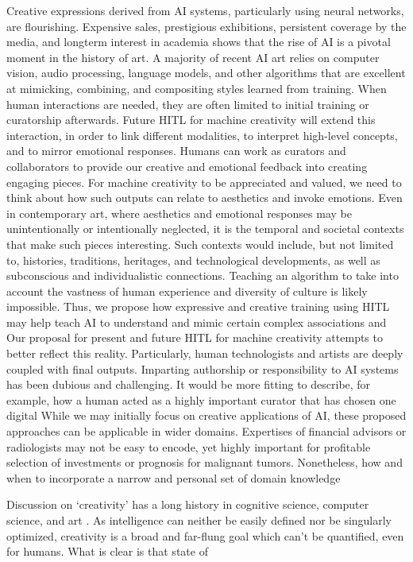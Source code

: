 \documentclass[letterpaper]{article} %
\begin{document}
Creative expressions derived from AI systems, particularly using neural networks, are flourishing. Expensive sales, prestigious exhibitions, persistent coverage by the media, and longterm interest in academia shows that the rise of AI is a pivotal moment in the history of art. A majority of recent AI art relies on computer vision, audio processing, language models, and other algorithms that are excellent at mimicking, combining, and compositing styles learned from training. When human interactions are needed, they are often limited to initial training or curatorship afterwards. Future HITL for machine creativity will extend this interaction, in order to link different modalities, to interpret high-level concepts, and to mirror emotional responses. Humans can work as curators and collaborators to provide our creative and emotional feedback into creating engaging pieces.  For machine creativity to be appreciated and valued, we need to think about how such outputs can relate to aesthetics and invoke emotions. Even in contemporary art, where aesthetics and emotional responses may be unintentionally or intentionally neglected, it is the temporal and societal contexts that make such pieces interesting. Such contexts would include, but not limited to, histories, traditions, heritages, and technological developments, as well as subconscious and individualistic connections. Teaching an algorithm to take into account the vastness of human experience and diversity of culture is likely impossible. Thus, we propose how expressive and creative training using HITL may help teach AI to understand and mimic certain complex associations and  Our proposal for present and future HITL for machine creativity attempts to better reflect this reality. Particularly, human technologists and artists are deeply coupled with final outputs. Imparting authorship or responsibility to AI systems has been dubious and challenging. It would be more fitting to describe, for example, how a human acted as a highly important curator that has chosen one digital  While we may initially focus on creative applications of AI, these proposed approaches can be applicable in wider domains. Expertises of financial advisors or radiologists may not be easy to encode, yet highly important for profitable selection of investments or prognosis for malignant tumors. Nonetheless, how and when to incorporate a narrow and personal set of domain knowledge

Discussion on `creativity' has a long history in cognitive science, computer science, and art \cite[e.g.,][]{Cohen1979, Wilson1983, Boden1996, Nake1998}. As intelligence can neither be easily defined nor be singularly optimized, creativity is a broad and far-flung goal which can't be quantified, even for humans. What is clear is that state of

\clearpage

\end{document}
